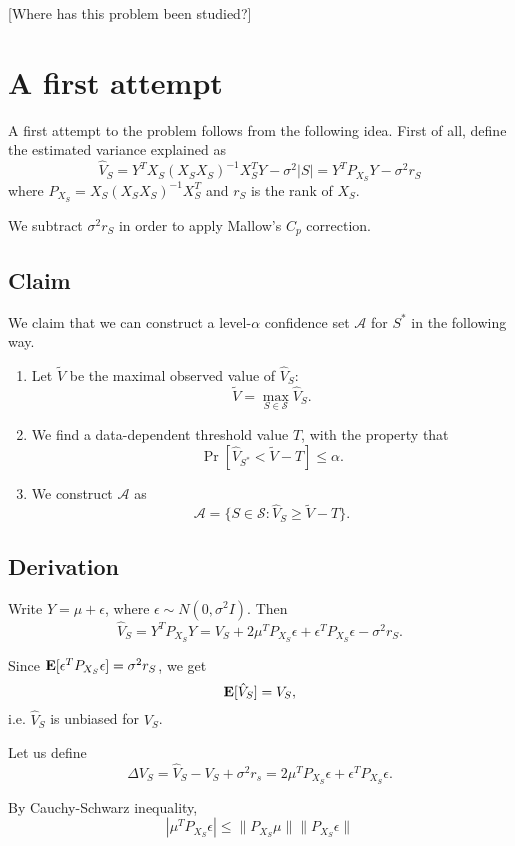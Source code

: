 \documentclass[12pt]{article}
\begin{document}
[Where has this problem been studied?]

\section{A first attempt}

A first attempt to the problem follows from the following idea.  First of all, define the estimated variance explained as
\[
\hat{V}_S = Y^T X_S (X_S X_S)^{-1} X_S^T Y - \sigma^2 |S| = Y^T P_{X_S} Y - \sigma^2 r_S
\]
where $P_{X_S} = X_S (X_S X_S)^{-1} X_S^T$ and $r_S$ is the rank of $X_S.$

We subtract $\sigma^2 r_S$ in order to apply Mallow's $C_p$ correction.

\subsection{Claim}

We claim that we can construct a level-$\alpha$ confidence set $\mathcal{A}$ for $S^*$ in the following way.

\begin{enumerate}
\item Let $\tilde{V}$ be the maximal observed value of $\hat{V}_S$:
\[
\tilde{V} = \max_{S \in \mathcal{S}} \hat{V}_S.
\]
\item We find a data-dependent threshold value $T$, with the property that
\[
\Pr[\hat{V}_{S^*} < \tilde{V} - T] \leq \alpha.
\]
\item We construct $\mathcal{A}$ as
\[
\mathcal{A} = \{S \in \mathcal{S}: \hat{V}_S \geq \tilde{V} - T \}.
\]
\end{enumerate}

\subsection{Derivation}


Write $Y = \mu + \epsilon$, where $\epsilon \sim N(0, \sigma^2 I)$.
Then
\[
\hat{V}_S =  Y^T P_{X_S} Y = V_S + 2 \mu^T P_{X_S} \epsilon + \epsilon^T P_{X_S} \epsilon - \sigma^2 r_S.
\]

Since $\textbf{E}[\epsilon^T P_{X_S} \epsilon] = \sigma^2 r_S$, we get
\[
\textbf{E}[\hat{V}_S] = V_S,
\]
i.e. $\hat{V}_S$ is unbiased for $V_S$.

Let us define
\[
\Delta V_S = \hat{V}_S - V_S +\sigma^2 r_s = 2 \mu^T P_{X_S} \epsilon + \epsilon^T P_{X_S} \epsilon.
\]

By Cauchy-Schwarz inequality,
\[
|\mu^T P_{X_S} \epsilon | \leq \| P_{X_S} \mu\| \| P_{X_S} \epsilon \|
\]
\end{document}
